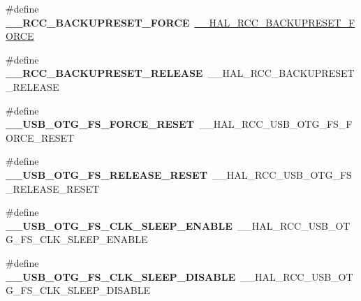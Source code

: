 \begin{DoxyCompactItemize}
\#define {\bfseries \+\_\+\+\_\+\+R\+C\+C\+\_\+\+B\+A\+C\+K\+U\+P\+R\+E\+S\+E\+T\+\_\+\+F\+O\+R\+CE}~\hyperlink{group___r_c_c___internal___r_t_c___clock___configuration_ga3bf7da608ff985873ca8e248fb1dc4f0}{\+\_\+\+\_\+\+H\+A\+L\+\_\+\+R\+C\+C\+\_\+\+B\+A\+C\+K\+U\+P\+R\+E\+S\+E\+T\+\_\+\+F\+O\+R\+CE}
\item 
\mbox{\label{group___h_a_l___r_c_c___aliased_ga16e2165e9541a9ffbf34614eb6ef91c2}} 
\#define {\bfseries \+\_\+\+\_\+\+R\+C\+C\+\_\+\+B\+A\+C\+K\+U\+P\+R\+E\+S\+E\+T\+\_\+\+R\+E\+L\+E\+A\+SE}~\+\_\+\+\_\+\+H\+A\+L\+\_\+\+R\+C\+C\+\_\+\+B\+A\+C\+K\+U\+P\+R\+E\+S\+E\+T\+\_\+\+R\+E\+L\+E\+A\+SE
\item 
\mbox{\label{group___h_a_l___r_c_c___aliased_ga4cbf3d0cd9c1f29b7f38cd672a7f81a3}} 
\#define {\bfseries \+\_\+\+\_\+\+U\+S\+B\+\_\+\+O\+T\+G\+\_\+\+F\+S\+\_\+\+F\+O\+R\+C\+E\+\_\+\+R\+E\+S\+ET}~\+\_\+\+\_\+\+H\+A\+L\+\_\+\+R\+C\+C\+\_\+\+U\+S\+B\+\_\+\+O\+T\+G\+\_\+\+F\+S\+\_\+\+F\+O\+R\+C\+E\+\_\+\+R\+E\+S\+ET
\item 
\mbox{\label{group___h_a_l___r_c_c___aliased_ga0c1425084511fd2205b412ee47165041}} 
\#define {\bfseries \+\_\+\+\_\+\+U\+S\+B\+\_\+\+O\+T\+G\+\_\+\+F\+S\+\_\+\+R\+E\+L\+E\+A\+S\+E\+\_\+\+R\+E\+S\+ET}~\+\_\+\+\_\+\+H\+A\+L\+\_\+\+R\+C\+C\+\_\+\+U\+S\+B\+\_\+\+O\+T\+G\+\_\+\+F\+S\+\_\+\+R\+E\+L\+E\+A\+S\+E\+\_\+\+R\+E\+S\+ET
\item 
\mbox{\label{group___h_a_l___r_c_c___aliased_ga86e49075f8526ea61ca22a6f83ca65d7}} 
\#define {\bfseries \+\_\+\+\_\+\+U\+S\+B\+\_\+\+O\+T\+G\+\_\+\+F\+S\+\_\+\+C\+L\+K\+\_\+\+S\+L\+E\+E\+P\+\_\+\+E\+N\+A\+B\+LE}~\+\_\+\+\_\+\+H\+A\+L\+\_\+\+R\+C\+C\+\_\+\+U\+S\+B\+\_\+\+O\+T\+G\+\_\+\+F\+S\+\_\+\+C\+L\+K\+\_\+\+S\+L\+E\+E\+P\+\_\+\+E\+N\+A\+B\+LE
\item 
\mbox{\label{group___h_a_l___r_c_c___aliased_ga5e698c23794023e6a3bc1d636f969d29}} 
\#define {\bfseries \+\_\+\+\_\+\+U\+S\+B\+\_\+\+O\+T\+G\+\_\+\+F\+S\+\_\+\+C\+L\+K\+\_\+\+S\+L\+E\+E\+P\+\_\+\+D\+I\+S\+A\+B\+LE}~\+\_\+\+\_\+\+H\+A\+L\+\_\+\+R\+C\+C\+\_\+\+U\+S\+B\+\_\+\+O\+T\+G\+\_\+\+F\+S\+\_\+\+C\+L\+K\+\_\+\+S\+L\+E\+E\+P\+\_\+\+D\+I\+S\+A\+B\+LE
\item 

\end{DoxyCompactItemize}
